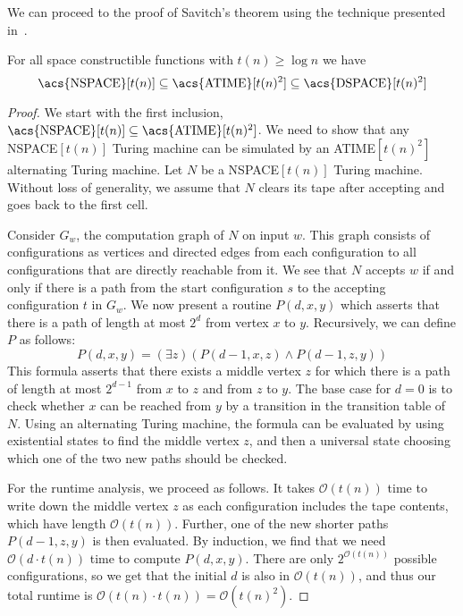 We can proceed to the proof of Savitch's theorem using the technique presented in~\cite{descriptive-complexity}.
\begin{theorem}
    For all space constructible functions with $t(n) \geq \log n$ we have
    \[
        \text{\upshape \acs{NSPACE}}[t(n)] \subseteq \text{\upshape \acs{ATIME}}[t(n)^2] \subseteq \text{\upshape \acs{DSPACE}}[t(n)^2]
    \]
\end{theorem}

\begin{proof}
    We start with the first inclusion, $\text{\acs{NSPACE}}[t(n)] \subseteq \text{\acs{ATIME}}[t(n)^2]$.
    We need to show that any \acs{NSPACE}$[t(n)]$ Turing machine can be simulated by an \acs{ATIME}$[t(n)^2]$ alternating Turing machine.
    Let $N$ be a \acs{NSPACE}$[t(n)]$ Turing machine.
    Without loss of generality, we assume that $N$ clears its tape after accepting and goes back to the first cell.

    Consider $G_w$, the computation graph of $N$ on input $w$.
    This graph consists of configurations as vertices and directed edges from each configuration to all configurations that are directly reachable from it.
    We see that $N$ accepts $w$ if and only if there is a path from the start configuration $s$ to the accepting configuration $t$ in $G_w$.
    We now present a routine $P(d, x, y)$ which asserts that there is a path of length at most $2^{d}$ from vertex $x$ to $y$.
    Recursively, we can define $P$ as follows:
    \[
        P(d, x, y) = (\exists z)(P(d - 1, x, z) \land P(d - 1, z, y))
    \]
    This formula asserts that there exists a middle vertex $z$ for which there is a path of length at most $2^{d - 1}$ from $x$ to $z$ and from $z$ to $y$.
    The base case for $d = 0$ is to check whether $x$ can be reached from $y$ by a transition in the transition table of $N$.
    Using an alternating Turing machine, the formula can be evaluated by using existential states to find the middle vertex $z$, and then a universal state choosing which one of the two new paths should be checked.

    For the runtime analysis, we proceed as follows.
    It takes $\mathcal{O}(t(n))$ time to write down the middle vertex $z$ as each configuration includes the tape contents, which have length $\mathcal{O}(t(n))$.
    Further, one of the new shorter paths $P(d - 1, z, y)$ is then evaluated.
    By induction, we find that we need $\mathcal{O}(d\cdot t(n))$ time to compute $P(d, x, y)$.
    There are only $2^{\mathcal{O}(t(n))}$ possible configurations, so we get that the initial $d$ is also in $\mathcal{O}(t(n))$, and thus our total runtime is $\mathcal{O}(t(n)\cdot t(n)) = \mathcal{O}(t(n)^2)$.


\end{proof}

